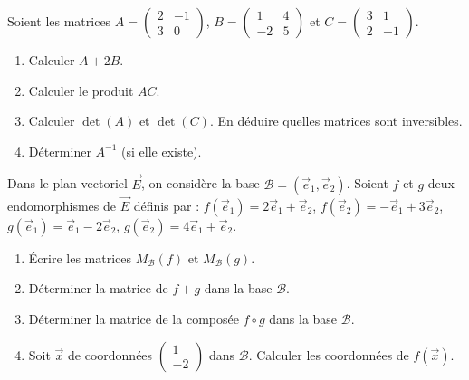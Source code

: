 \documentclass[11pt]{article}
\begin{document}
\begin{exercice}
Soient les matrices $A = \begin{pmatrix} 2 & -1 \\ 3 & 0 \end{pmatrix}$, $B = \begin{pmatrix} 1 & 4 \\ -2 & 5 \end{pmatrix}$ et $C = \begin{pmatrix} 3 & 1 \\ 2 & -1 \end{pmatrix}$.
\begin{enumerate}
    \item Calculer $A + 2B$.
    \item Calculer le produit $AC$.
    \item Calculer $\det(A)$ et $\det(C)$. En déduire quelles matrices sont inversibles.
    \item Déterminer $A^{-1}$ (si elle existe).
\end{enumerate}
\end{exercice}

\begin{exercice}
Dans le plan vectoriel $\overrightarrow{E}$, on considère la base $\mathcal{B}=(\vec{e}_1,\vec{e}_2)$.
Soient $f$ et $g$ deux endomorphismes de $\overrightarrow{E}$ définis par :
$f(\vec{e}_1) = 2\vec{e}_1 + \vec{e}_2$, \quad $f(\vec{e}_2) = -\vec{e}_1 + 3\vec{e}_2$,
$g(\vec{e}_1) = \vec{e}_1 - 2\vec{e}_2$, \quad $g(\vec{e}_2) = 4\vec{e}_1 + \vec{e}_2$.
\begin{enumerate}
    \item Écrire les matrices $M_{\mathcal{B}}(f)$ et $M_{\mathcal{B}}(g)$.
    \item Déterminer la matrice de $f+g$ dans la base $\mathcal{B}$.
    \item Déterminer la matrice de la composée $f \circ g$ dans la base $\mathcal{B}$.
    \item Soit $\vec{x}$ de coordonnées $\begin{pmatrix} 1 \\ -2 \end{pmatrix}$ dans $\mathcal{B}$. Calculer les coordonnées de $f(\vec{x})$.
\end{enumerate}
\end{exercice}
\end{document}
